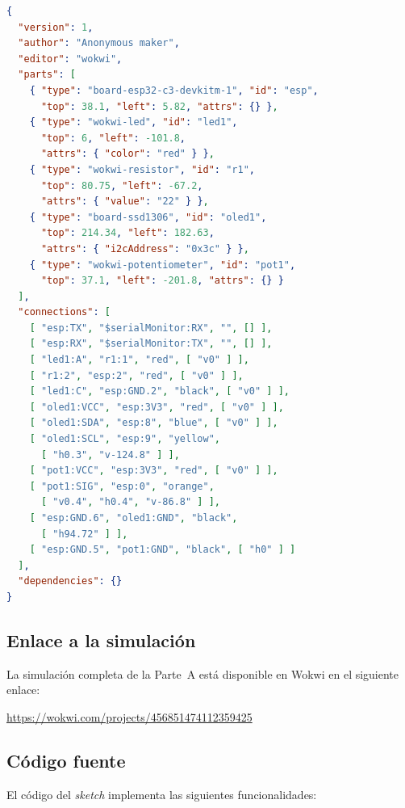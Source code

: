 \documentclass[11pt,a4paper]{article}
\begin{document}
\begin{lstlisting}[language=JSON, caption={diagram.json -- Parte A}, label={lst:diagram-a}]
{
  "version": 1,
  "author": "Anonymous maker",
  "editor": "wokwi",
  "parts": [
    { "type": "board-esp32-c3-devkitm-1", "id": "esp",
      "top": 38.1, "left": 5.82, "attrs": {} },
    { "type": "wokwi-led", "id": "led1",
      "top": 6, "left": -101.8,
      "attrs": { "color": "red" } },
    { "type": "wokwi-resistor", "id": "r1",
      "top": 80.75, "left": -67.2,
      "attrs": { "value": "22" } },
    { "type": "board-ssd1306", "id": "oled1",
      "top": 214.34, "left": 182.63,
      "attrs": { "i2cAddress": "0x3c" } },
    { "type": "wokwi-potentiometer", "id": "pot1",
      "top": 37.1, "left": -201.8, "attrs": {} }
  ],
  "connections": [
    [ "esp:TX", "$serialMonitor:RX", "", [] ],
    [ "esp:RX", "$serialMonitor:TX", "", [] ],
    [ "led1:A", "r1:1", "red", [ "v0" ] ],
    [ "r1:2", "esp:2", "red", [ "v0" ] ],
    [ "led1:C", "esp:GND.2", "black", [ "v0" ] ],
    [ "oled1:VCC", "esp:3V3", "red", [ "v0" ] ],
    [ "oled1:SDA", "esp:8", "blue", [ "v0" ] ],
    [ "oled1:SCL", "esp:9", "yellow",
      [ "h0.3", "v-124.8" ] ],
    [ "pot1:VCC", "esp:3V3", "red", [ "v0" ] ],
    [ "pot1:SIG", "esp:0", "orange",
      [ "v0.4", "h0.4", "v-86.8" ] ],
    [ "esp:GND.6", "oled1:GND", "black",
      [ "h94.72" ] ],
    [ "esp:GND.5", "pot1:GND", "black", [ "h0" ] ]
  ],
  "dependencies": {}
}
\end{lstlisting}

\subsection{Enlace a la simulación}

La simulación completa de la Parte~A está disponible en Wokwi en el siguiente enlace:

\begin{center}
\url{https://wokwi.com/projects/456851474112359425}
\end{center}

\subsection{Código fuente}

El código del \textit{sketch} implementa las siguientes funcionalidades:
\end{document}
